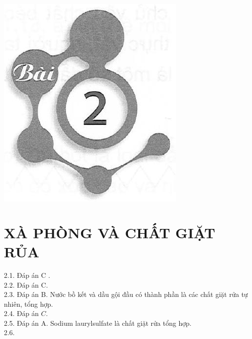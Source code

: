 \documentclass[10pt]{article}
\begin{document}
\includegraphics[max width=\textwidth, center]{2025_10_23_b4e16b74380d0f7e7700g-007}

\section*{XÀ PHÒNG VÀ CHẤT GIẶT RỦA}
2.1. Đáp án C .\\
2.2. Đáp án C.\\
2.3. Đáp án B. Nước bồ kết và dầu gội đầu có thành phần là các chất giặt rửa tự nhiên, tổng hợp.\\
2.4. Đáp án $C$.\\
2.5. Đáp án A. Sodium laurylsulfate là chất giặt rửa tổng hợp.\\
2.6.
\end{document}
